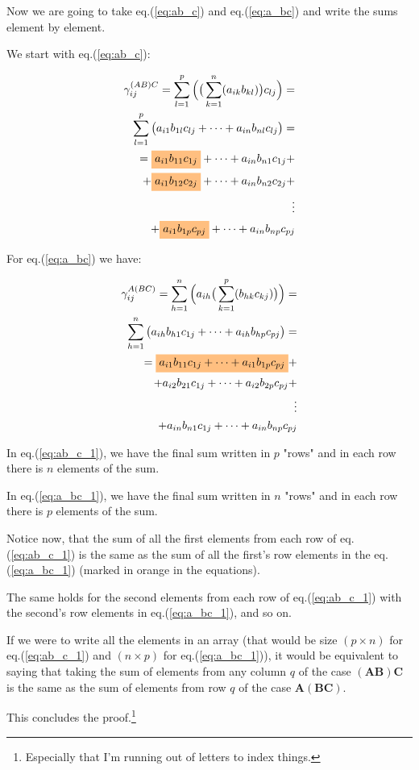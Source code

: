 \documentclass[10pt,twocolumn]{article}
\newcommand{\highlight}[1]{%
  \colorbox{orange!50}{$\displaystyle#1$}}
\begin{document}
Now we are going to take eq.(\ref{eq:ab_c}) and eq.(\ref{eq:a_bc}) and write the sums element by element.

We start with eq.(\ref{eq:ab_c}):

\begin{equation} \label{eq:ab_c_1}
\begin{split}
\gamma_{ij}^{(AB)C} = \sum_{l=1}^{p} \Big( \big( \sum_{k=1}^{n} (a_{ik} b_{kl}) \big) c_{lj} \Big) = \\
\sum_{l=1}^{p} \big( a_{i1} b_{1l} c_{lj} + \dots + a_{in} b_{nl} c_{lj} \big) = \\ 
= \highlight{a_{i1} b_{11} c_{1j}} + \dots + a_{in} b_{n1} c_{1j} + \\ 
+ \highlight{a_{i1} b_{12} c_{2j}} + \dots + a_{in} b_{n2} c_{2j} + \\ 
\vdots \\ 
+ \highlight{a_{i1} b_{1p} c_{pj}} + \dots + a_{in} b_{np} c_{pj}
\end{split}
\end{equation}

For eq.(\ref{eq:a_bc}) we have:

\begin{equation} \label{eq:a_bc_1}
\begin{split}
\gamma_{ij}^{A(BC)} = \sum_{h=1}^{n} \Big(  a_{ih} \big( \sum_{k=1}^{p} (b_{hk} c_{kj}) \big) \Big) = \\
 \sum_{h=1}^{n}  \big( a_{ih} b_{h1} c_{1j} + \dots + a_{ih} b_{hp} c_{pj}   \big) = \\
= \highlight{a_{i1} b_{11} c_{1j} + \dots + a_{i1} b_{1p} c_{pj}} + \\ 
+ a_{i2} b_{21} c_{1j} + \dots + a_{i2} b_{2p} c_{pj} + \\ 
\vdots \\ 
+ a_{in} b_{n1} c_{1j} + \dots + a_{in} b_{np} c_{pj}
\end{split}
\end{equation}

In eq.(\ref{eq:ab_c_1}), we have the final sum written in $p$ "rows" and in each row there is $n$ elements of the sum.

In eq.(\ref{eq:a_bc_1}), we have the final sum written in $n$ "rows" and in each row there is $p$ elements of the sum.

Notice now, that the sum of all the first elements from each row of eq.(\ref{eq:ab_c_1}) is the same as the sum of all the first's row elements in the eq.(\ref{eq:a_bc_1}) (marked in orange in the equations).

The same holds for the second elements from each row of eq.(\ref{eq:ab_c_1}) with the second's row elements in eq.(\ref{eq:a_bc_1}), and so on.

If we were to write all the elements in an array (that would be size $(p \times n)$ for eq.(\ref{eq:ab_c_1}) and $(n \times p)$ for eq.(\ref{eq:a_bc_1})), it would be equivalent to saying that taking the sum of elements from any column $q$ of the case $(\bm{A} \bm{B}) \bm{C}$ is the same as the sum of elements from row $q$ of the case $\bm{A} (\bm{B} \bm{C})$.

This concludes the proof.\footnote{Especially that I'm running out of letters to index things.}
\end{document}
